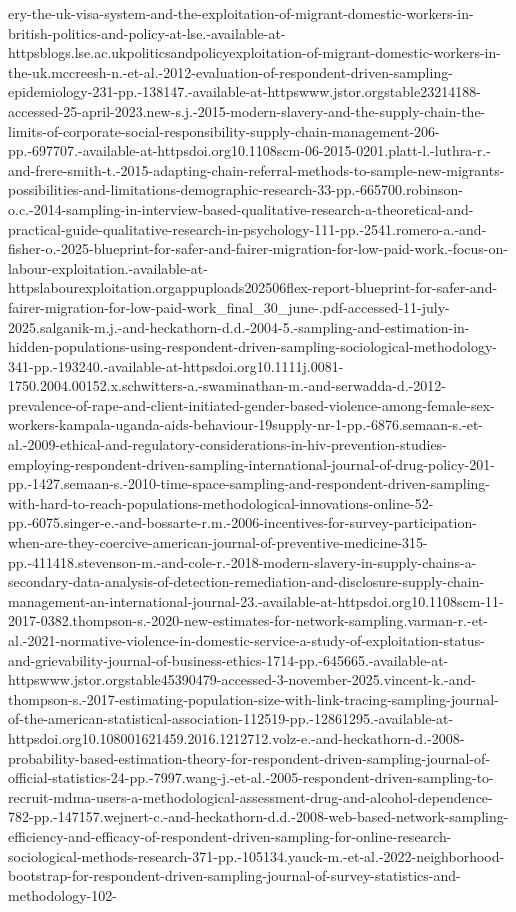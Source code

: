 \documentclass[
  12pt,
  letterpaper,
  DIV=11,
  numbers=noendperiod]{scrartcl}
\begin{document}
{{ery-the-uk-visa-system-and-the-exploitation-of-migrant-domestic-workers-in-british-politics-and-policy-at-lse.-available-at-httpsblogs.lse.ac.ukpoliticsandpolicyexploitation-of-migrant-domestic-workers-in-the-uk.mccreesh-n.-et-al.-2012-evaluation-of-respondent-driven-sampling-epidemiology-231-pp.-138147.-available-at-httpswww.jstor.orgstable23214188-accessed-25-april-2023.new-s.j.-2015-modern-slavery-and-the-supply-chain-the-limits-of-corporate-social-responsibility-supply-chain-management-206-pp.-697707.-available-at-httpsdoi.org10.1108scm-06-2015-0201.platt-l.-luthra-r.-and-frere-smith-t.-2015-adapting-chain-referral-methods-to-sample-new-migrants-possibilities-and-limitations-demographic-research-33-pp.-665700.robinson-o.c.-2014-sampling-in-interview-based-qualitative-research-a-theoretical-and-practical-guide-qualitative-research-in-psychology-111-pp.-2541.romero-a.-and-fisher-o.-2025-blueprint-for-safer-and-fairer-migration-for-low-paid-work.-focus-on-labour-exploitation.-available-at-httpslabourexploitation.orgappuploads202506flex-report-blueprint-for-safer-and-fairer-migration-for-low-paid-work_final_30_june-.pdf-accessed-11-july-2025.salganik-m.j.-and-heckathorn-d.d.-2004-5.-sampling-and-estimation-in-hidden-populations-using-respondent-driven-sampling-sociological-methodology-341-pp.-193240.-available-at-httpsdoi.org10.1111j.0081-1750.2004.00152.x.schwitters-a.-swaminathan-m.-and-serwadda-d.-2012-prevalence-of-rape-and-client-initiated-gender-based-violence-among-female-sex-workers-kampala-uganda-aids-behaviour-19supply-nr-1-pp.-6876.semaan-s.-et-al.-2009-ethical-and-regulatory-considerations-in-hiv-prevention-studies-employing-respondent-driven-sampling-international-journal-of-drug-policy-201-pp.-1427.semaan-s.-2010-time-space-sampling-and-respondent-driven-sampling-with-hard-to-reach-populations-methodological-innovations-online-52-pp.-6075.singer-e.-and-bossarte-r.m.-2006-incentives-for-survey-participation-when-are-they-coercive-american-journal-of-preventive-medicine-315-pp.-411418.stevenson-m.-and-cole-r.-2018-modern-slavery-in-supply-chains-a-secondary-data-analysis-of-detection-remediation-and-disclosure-supply-chain-management-an-international-journal-23.-available-at-httpsdoi.org10.1108scm-11-2017-0382.thompson-s.-2020-new-estimates-for-network-sampling.varman-r.-et-al.-2021-normative-violence-in-domestic-service-a-study-of-exploitation-status-and-grievability-journal-of-business-ethics-1714-pp.-645665.-available-at-httpswww.jstor.orgstable45390479-accessed-3-november-2025.vincent-k.-and-thompson-s.-2017-estimating-population-size-with-link-tracing-sampling-journal-of-the-american-statistical-association-112519-pp.-12861295.-available-at-httpsdoi.org10.108001621459.2016.1212712.volz-e.-and-heckathorn-d.-2008-probability-based-estimation-theory-for-respondent-driven-sampling-journal-of-official-statistics-24-pp.-7997.wang-j.-et-al.-2005-respondent-driven-sampling-to-recruit-mdma-users-a-methodological-assessment-drug-and-alcohol-dependence-782-pp.-147157.wejnert-c.-and-heckathorn-d.d.-2008-web-based-network-sampling-efficiency-and-efficacy-of-respondent-driven-sampling-for-online-research-sociological-methods-research-371-pp.-105134.yauck-m.-et-al.-2022-neighborhood-bootstrap-for-respondent-driven-sampling-journal-of-survey-statistics-and-methodology-102-}}
\end{document}
